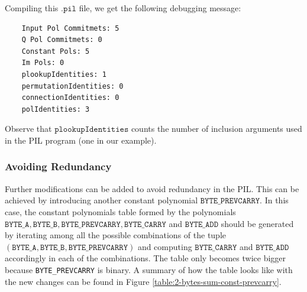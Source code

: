 Compiling this $\mathtt{.pil}$ file, we get the following debugging message:
\begin{lstlisting}
    Input Pol Commitmets: 5
    Q Pol Commitmets: 0
    Constant Pols: 5
    Im Pols: 0
    plookupIdentities: 1
    permutationIdentities: 0
    connectionIdentities: 0
    polIdentities: 3
\end{lstlisting}

Observe that $\mathtt{plookupIdentities}$ counts the number of inclusion arguments used in the PIL program (one in our example). 

\subsubsection{Avoiding Redundancy}

Further modifications can be added to avoid redundancy in the PIL. This can be achieved by introducing another constant polynomial $\mathtt{BYTE\_PREVCARRY}$. In this case, the constant polynomials table formed by the polynomials $\mathtt{BYTE\_A}, \mathtt{BYTE\_B}, \mathtt{BYTE\_PREVCARRY}, \mathtt{BYTE\_CARRY}$ and $\mathtt{BYTE\_ADD}$ should be generated by iterating among all the possible combinations of the tuple $(\mathtt{BYTE\_A}, \mathtt{BYTE\_B}, \mathtt{BYTE\_PREVCARRY})$ and computing $\mathtt{BYTE\_CARRY}$ and $\mathtt{BYTE\_ADD}$ accordingly in each of the combinations. The table only becomes twice bigger because \texttt{BYTE\_PREVCARRY} is binary. A summary of how the table looks like with the new changes can be found in Figure \ref{table:2-bytes-sum-const-prevcarry}. 

